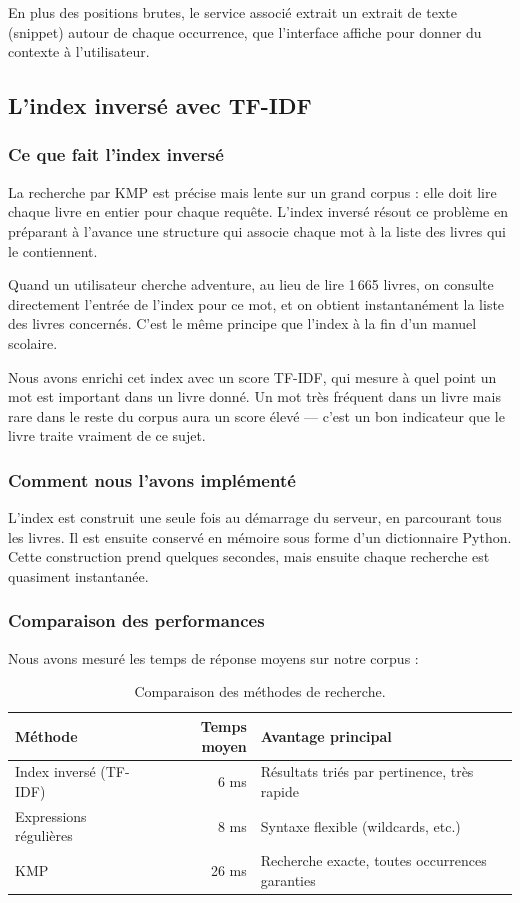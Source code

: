 \documentclass[12pt,a4paper]{article}
\begin{document}
En plus des positions brutes, le service associé extrait un extrait de texte
(snippet) autour de chaque occurrence, que l'interface affiche pour donner
du contexte à l'utilisateur.

\subsection{L'index inversé avec TF-IDF}

\subsubsection{Ce que fait l'index inversé}

La recherche par KMP est précise mais lente sur un grand corpus : elle doit
lire chaque livre en entier pour chaque requête. L'index inversé résout ce
problème en préparant à l'avance une structure qui associe chaque mot à la
liste des livres qui le contiennent.

Quand un utilisateur cherche \og adventure\fg{}, au lieu de lire 1\,665 livres,
on consulte directement l'entrée de l'index pour ce mot, et on obtient
instantanément la liste des livres concernés. C'est le même principe que
l'index à la fin d'un manuel scolaire.

Nous avons enrichi cet index avec un score TF-IDF, qui mesure à quel point
un mot est important dans un livre donné. Un mot très fréquent dans un livre
mais rare dans le reste du corpus aura un score élevé — c'est un bon indicateur
que le livre traite vraiment de ce sujet.

\subsubsection{Comment nous l'avons implémenté}

L'index est construit une seule fois au démarrage du serveur, en parcourant
tous les livres. Il est ensuite conservé en mémoire sous forme d'un dictionnaire
Python. Cette construction prend quelques secondes, mais ensuite chaque
recherche est quasiment instantanée.

\subsubsection{Comparaison des performances}

Nous avons mesuré les temps de réponse moyens sur notre corpus :

\begin{table}[h]
\centering
\caption{Comparaison des méthodes de recherche.}
\label{tab:bench}
\begin{tabular}{lrp{6cm}}
\toprule
\textbf{Méthode} & \textbf{Temps moyen} & \textbf{Avantage principal} \\
\midrule
Index inversé (TF-IDF) & 6 ms  & Résultats triés par pertinence, très rapide \\
Expressions régulières  & 8 ms  & Syntaxe flexible (wildcards, etc.) \\
KMP                     & 26 ms & Recherche exacte, toutes occurrences garanties \\
\bottomrule
\end{tabular}
\end{table}
\end{document}

